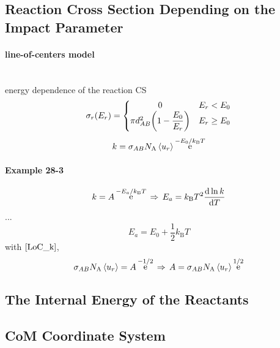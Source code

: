 \documentclass[a4paper]{article}
\DeclareMathOperator{\e}{\mathrm{e}}
\newcommand{\NA}{N_\mathrm{A}}
\newcommand{\kB}{k_\mathrm{B}}
\DeclareMathOperator{\dra}{\;\Rightarrow\;}
\numberwithin{equation}{section}
\begin{document}
\subsection{Reaction Cross Section Depending on the Impact Parameter}
\paragraph{line-of-centers model}~\\
energy dependence of the reaction CS
\begin{equation}\label{key}
\sigma_r(E_r) = \left\{
\mqty{0            & E_r<E_0\\
	\pi d_{AB}^2\qty(1-\dfrac{E_0}{E_r}) & E_r \geq E_0}\right.
\end{equation}
\begin{equation}\label{LoC_k}
k = \sigma_{AB}\NA \ev{u_r} \e^{-E_0/\kB T}
\end{equation}
\paragraph{Example 28-3}
\begin{equation}\label{key}
k = A\e^{-E_a/\kB T} \dra E_a = \kB T^2\dv{\ln k}{T}
\end{equation}
...
\begin{equation}\label{key}
E_a = E_0 + \dfrac{1}{2}\kB T
\end{equation}
with $ \eqref{LoC_k} $,
\begin{equation}\label{key}
\sigma_{AB}\NA \ev{u_r} = A\e^{-1/2} \dra A = \sigma_{AB}\NA \ev{u_r}\e^{1/2}
\end{equation}

\subsection{}

\subsection{The Internal Energy of the Reactants}

\subsection{CoM Coordinate System}

\subsection{}

\subsection{}

\subsection{}

\subsection{}
\subsection{}
\end{document}
